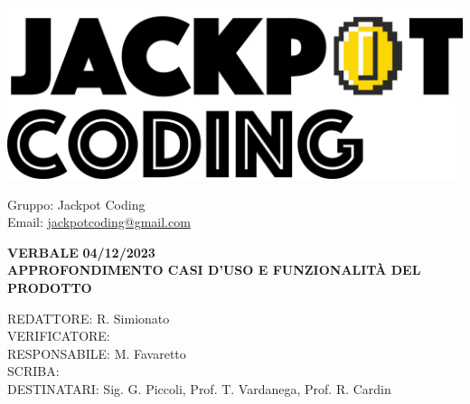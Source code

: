 \documentclass[5pt]{article}
\begin{document}
\begin{minipage}[t]{0.50\textwidth}
    \begin{flushleft}
        \hspace{10pt}
        \includegraphics[scale=0.65]{jackpot-logo.png} 
    \end{flushleft}
\end{minipage}
\hspace{-60pt} %
\begin{flushright}
    \begin{minipage}[t]{0.50\textwidth}
        \begin{flushright}
            Gruppo: {\Large Jackpot Coding}\\
            Email: \href{mailto:jackpotcoding@gmail.com}{jackpotcoding@gmail.com}
        \end{flushright}
    \end{minipage}
\end{flushright}

\vspace{20pt}

\begin{center}
    \textbf{\large VERBALE }
    \textbf{\large 04/12/2023} \\
    \textbf{\LARGE APPROFONDIMENTO CASI D'USO E FUNZIONALITÀ DEL PRODOTTO}
\end{center}

\vspace{13pt}

\begin{flushleft}
    \begin{spacing}{1.5}
        REDATTORE: R. Simionato\\ 
        VERIFICATORE: \\ %
        RESPONSABILE: M. Favaretto\\ 
        \vspace{7pt}
        SCRIBA: \\ %
        \vspace{7pt}
        DESTINATARI: Sig. G. Piccoli, Prof. T. Vardanega, Prof. R. Cardin\\ 
    \end{spacing}
\end{flushleft}
\end{document}
